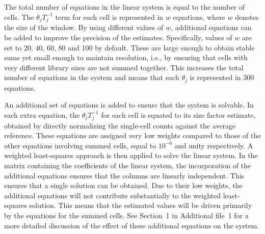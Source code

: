 \documentclass{bmcart}
\newcommand{\supplineardep}{1}
\begin{document}

The total number of equations in the linear system is equal to the number of cells.
The $\theta_jT_j^{-1}$ term for each cell is represented in $w$ equations, where $w$ denotes the size of the window.
By using different values of $w$, additional equations can be added to improve the precision of the estimates. 
Specifically, values of $w$ are set to 20, 40, 60, 80 and 100 by default.
These are large enough to obtain stable sums yet small enough to maintain resolution, i.e., by ensuring that cells with very different library sizes are not summed together.
This increases the total number of equations in the system and means that each $\theta_j$ is represented in 300 equations. 

An additional set of equations is added to ensure that the system is solvable.
In each extra equation, the $\theta_jT_j^{-1}$ for each cell is equated to its size factor estimate, obtained by directly normalizing the single-cell counts against the average reference.
These equations are assigned very low weights compared to those of the other equations involving summed cells, equal to $10^{-6}$ and unity respectively.
A weighted least-squares approach is then applied to solve the linear system.
In the matrix containing the coefficients of the linear system, the incorporation of the additional equations ensures that the columns are linearly independent.
This ensures that a single solution can be obtained.
Due to their low weights, the additional equations will not contribute substantially to the weighted least-squares solution.
This means that the estimated values will be driven primarily by the equations for the summed cells.
See Section~\supplineardep{} in Additional file~1 for a more detailed discussion of the effect of these additional equations on the system.
\end{document}
